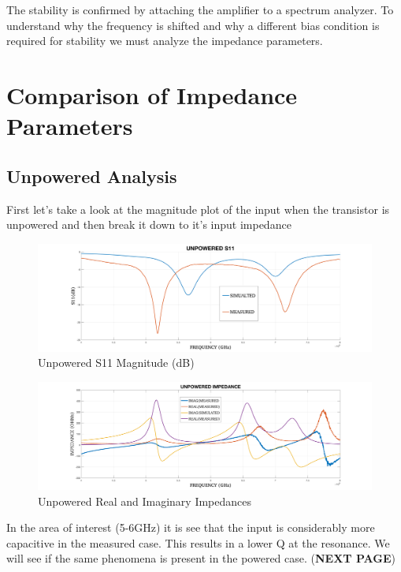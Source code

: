 \documentclass{article}                                                         %
\begin{document}
The stability is confirmed by attaching the amplifier to a spectrum analyzer. To understand why the frequency
is shifted and why a different bias condition is required for stability we must analyze the impedance parameters.

\section{Comparison of Impedance Parameters}
\subsection{Unpowered Analysis}
  First let's take a look at the magnitude plot of the input when the transistor is unpowered and then break it down to it's
  input impedance
  \begin{figure}[H]
    \centering
    \includegraphics[width=1\textwidth] {Figures/unpowered_s11.png}
    \caption{Unpowered S11 Magnitude (dB)}
      \label{fig:f3}
  \end{figure}

  \begin{figure}[H]
    \centering
    \includegraphics[width=1\textwidth] {Figures/unpowered_impedance.png}
    \caption{Unpowered Real and Imaginary Impedances}
      \label{fig:f4}
  \end{figure}

In the area of interest (5-6GHz) it is see that the input is considerably more capacitive in the measured case. This
results in a lower Q at the resonance. We will see if the same phenomena is present in the powered case. (\textbf{NEXT PAGE})
\clearpage
\end{document}
